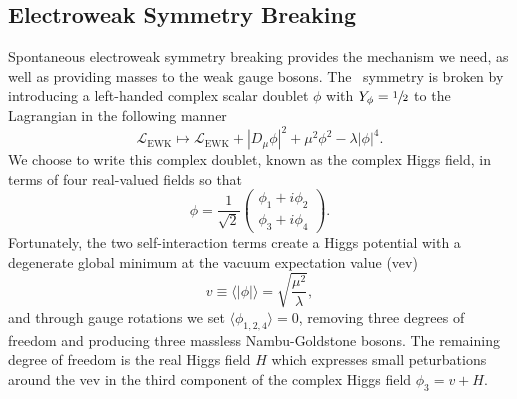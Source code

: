 \subsection{Electroweak Symmetry Breaking}
\label{subsec:ewsb}

Spontaneous electroweak symmetry breaking provides the mechanism we need, as well as providing masses to the weak gauge bosons. The \sutwo\ symmetry is broken by introducing a left-handed complex scalar doublet $\phi$ with $Y_\phi = \sfrac{1}{2}$ to the Lagrangian in the following manner
\begin{equation}
  \label{eqn:ewsb}
  \mathcal{L}_{\text{EWK}} \mapsto \mathcal{L}_{\text{EWK}} + \left|D_\mu \phi \right|^2 + \mu^2 \phi^2 - \lambda \left| \phi \right|^4 .
\end{equation}
We choose to write this complex doublet, known as the complex Higgs field, in terms of four real-valued fields so that
\begin{equation}
  \phi = \frac{1}{\sqrt{2}} \begin{pmatrix} \phi_1 + i \phi_2 \\ \phi_3 + i\phi_4 \end{pmatrix} .
\end{equation}
Fortunately, the two self-interaction terms create a Higgs potential with a degenerate global minimum at the vacuum expectation value (vev)
\begin{equation}
  v \equiv \langle | \phi | \rangle = \sqrt{ \frac{\mu^2}{\lambda}},
\end{equation}
and through gauge rotations we set $\langle \phi_{1,2,4} \rangle = 0$, removing three degrees of freedom and producing three massless Nambu-Goldstone bosons.
The remaining degree of freedom is the real Higgs field $H$ which expresses small peturbations around the vev in the third component of the complex Higgs field $\phi_3 = v + H$.

